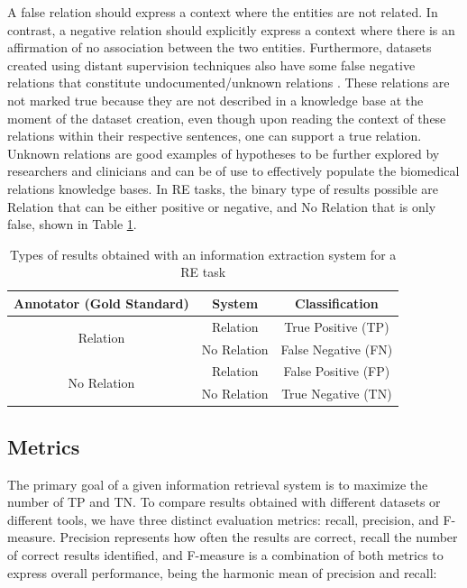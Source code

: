 A false relation should express a context where the entities are not related. In contrast, a negative relation should explicitly express a context where there is an affirmation of no association between the two entities. Furthermore, datasets created using distant supervision techniques also have some false negative relations that constitute undocumented/unknown relations \citep{sousa2019silver}. These relations are not marked true because they are not described in a knowledge base at the moment of the dataset creation, even though upon reading the context of these relations within their respective sentences, one can support a true relation. Unknown relations are good examples of hypotheses to be further explored by researchers and clinicians and can be of use to effectively populate the biomedical relations knowledge bases. In RE tasks, the binary type of results possible are Relation that can be either positive or negative, and No Relation that is only false, shown in Table \ref{table:evaluation}.

\begin{table}[ht]
\centering
\caption[Types of Results Obtained with an Information Extraction System for a Relation Extraction Task]{Types of results obtained with an information extraction system for a RE task}
\begin{tabular}{ccc}
\hline
Annotator (Gold Standard) & System & Classification\\
\hline
\multirow{2}{*}{Relation} & Relation & True Positive (TP) \\
 & No Relation & False Negative (FN) \\ 
\hline
\multirow{2}{*}{No Relation} & Relation & False Positive (FP) \\
 & No Relation & True Negative (TN) \\
 \hline
\end{tabular}
\label{table:evaluation}
\end{table}

\subsection{Metrics}

The primary goal of a given information retrieval system is to maximize the number of TP and TN. To compare results obtained with different datasets or different tools, we have three distinct evaluation metrics: recall, precision, and F-measure. Precision represents how often the results are correct, recall the number of correct results identified, and F-measure is a combination of both metrics to express overall performance, being the harmonic mean of precision and recall:

